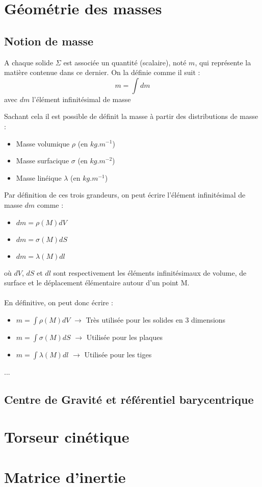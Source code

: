 \section{Géométrie des masses}
\subsection{Notion de masse}
\begin{defi}
A chaque solide $\Sigma$ est associée un quantité (scalaire), noté $m$, qui représente la matière contenue dans ce dernier. On la définie comme il suit :
$$m=\int dm$$
avec $dm$ l'élément infinitésimal de masse
\end{defi}

Sachant cela il est possible de définit la masse à partir des distributions de masse :
\begin{itemize}
    \item Masse volumique $\rho$ (en $kg.m^{-1}$)
    \item Masse surfacique $\sigma$ (en $kg.m^{-2}$)
    \item Masse linéique $\lambda$ (en $kg.m^{-1}$)
\end{itemize}
Par définition de ces trois grandeurs, on peut écrire l'élément infinitésimal de masse $dm$ comme :
\begin{itemize}
    \item $dm=\rho(M)dV$
    \item $dm=\sigma(M)dS$
    \item $dm=\lambda(M)dl$
\end{itemize}

où $dV$, $dS$ et $dl$ sont respectivement les éléments infinitésimaux de volume, de surface et le déplacement élémentaire autour d'un point M.\\
 \\
En définitive, on peut donc écrire :
\begin{itemize}
    \item $m=\int \rho(M)dV$ $\rightarrow$ Très utilisée pour les solides en 3 dimensions
    \item $m=\int \sigma(M)dS$ $\rightarrow$ Utilisée pour les plaques
    \item $m=\int \lambda(M)dl$ $\rightarrow$ Utilisée pour les tiges
\end{itemize}
\begin{ex}
...
\end{ex}

\subsection{Centre de Gravité et référentiel barycentrique}
\section{Torseur cinétique}
\section{Matrice d'inertie}
